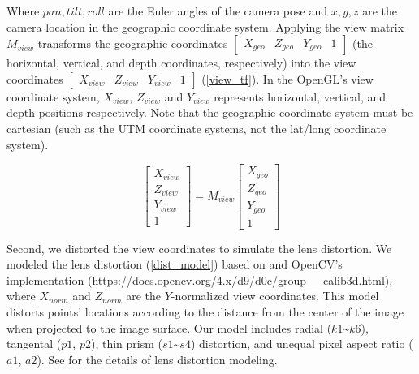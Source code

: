 \documentclass{article}
\begin{document}
Where \(pan, tilt, roll\) are the Euler angles of the camera pose and \(x, y, z\) are the camera location in the geographic coordinate system. Applying the view matrix \(M_{view}\) transforms the geographic coordinates \(\begin{bmatrix} X_{geo} & Z_{geo} & Y_{geo} & 1 \end{bmatrix}\) (the horizontal, vertical, and depth coordinates, respectively) into the view coordinates \(\begin{bmatrix} X_{view} & Z_{view} & Y_{view} & 1 \end{bmatrix}\) (\ref{view_tf}). In the OpenGL's view coordinate system, \(X_{view}\), \(Z_{view}\) and \(Y_{view}\) represents horizontal, vertical, and depth positions respectively. Note that the geographic coordinate system must be cartesian (such as the UTM coordinate systems, not the lat/long coordinate system).

\begin{equation}
\label{view_tf}
  \begin{bmatrix} 
    X_{view} \\ Z_{view} \\ Y_{view} \\ 1 
  \end{bmatrix}
  =
  M_{view}
  \begin{bmatrix} 
    X_{geo} \\ Z_{geo} \\ Y_{geo} \\ 1 
  \end{bmatrix}
\end{equation}

Second, we distorted the view coordinates to simulate the lens distortion. We modeled the lens distortion (\ref{dist_model}) based on \cite{Weng1992CameraCalib} and OpenCV's implementation (\url{https://docs.opencv.org/4.x/d9/d0c/group__calib3d.html}), where \(X_{norm}\) and \(Z_{norm}\) are the \(Y\)-normalized view coordinates. This model distorts points' locations according to the distance from the center of the image when projected to the image surface. Our model includes radial (\(k1\)\textasciitilde{}\(k6\)), tangental (\(p1\), \(p2\)), thin prism (\(s1\)\textasciitilde{}\(s4\)) distortion, and unequal pixel aspect ratio (\(a1\), \(a2\)). See \cite{Weng1992CameraCalib} for the details of lens distortion modeling.
\end{document}
